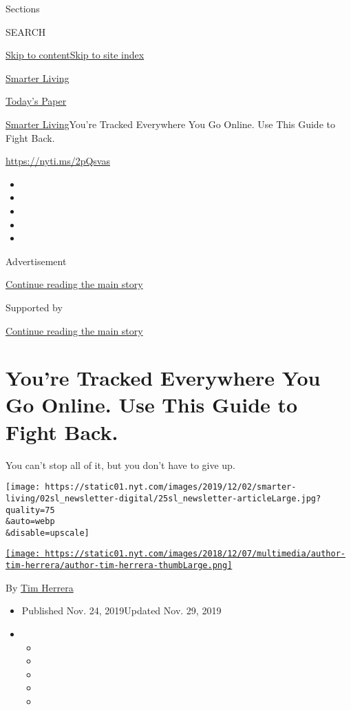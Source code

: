 Sections

SEARCH

\protect\hyperlink{site-content}{Skip to
content}\protect\hyperlink{site-index}{Skip to site index}

\href{https://www.nytimes.com/section/smarter-living}{Smarter Living}

\href{https://myaccount.nytimes.com/auth/login?response_type=cookie\&client_id=vi}{}

\href{https://www.nytimes.com/section/todayspaper}{Today's Paper}

\href{/section/smarter-living}{Smarter Living}\textbar{}You're Tracked
Everywhere You Go Online. Use This Guide to Fight Back.

\url{https://nyti.ms/2pQsvas}

\begin{itemize}
\item
\item
\item
\item
\item
\end{itemize}

Advertisement

\protect\hyperlink{after-top}{Continue reading the main story}

Supported by

\protect\hyperlink{after-sponsor}{Continue reading the main story}

\hypertarget{youre-tracked-everywhere-you-go-online-use-this-guide-to-fight-back}{%
\section{You're Tracked Everywhere You Go Online. Use This Guide to
Fight
Back.}\label{youre-tracked-everywhere-you-go-online-use-this-guide-to-fight-back}}

You can't stop all of it, but you don't have to give up.

\texttt{[image: https://static01.nyt.com/images/2019/12/02/smarter-living/02sl\_newsletter-digital/25sl\_newsletter-articleLarge.jpg?quality=75\\\&auto=webp\\\&disable=upscale]}

\href{https://www.nytimes.com/by/tim-herrera}{\texttt{[image: https://static01.nyt.com/images/2018/12/07/multimedia/author-tim-herrera/author-tim-herrera-thumbLarge.png]}}

By \href{https://www.nytimes.com/by/tim-herrera}{Tim Herrera}

\begin{itemize}
\item
  Published Nov. 24, 2019Updated Nov. 29, 2019
\item
  \begin{itemize}
  \item
  \item
  \item
  \item
  \item
  \end{itemize}
\end{itemize}

